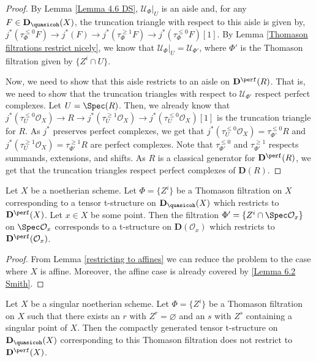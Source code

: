 \begin{proof}
    By Lemma \ref{Lemma 4.6 DS}, $\mathcal{U}_\Phi|_U$ is an aisle and, for any $F \in \mathbf{D}_{\quasicoh}(X)$, the truncation triangle with respect to this aisle is given by, $j^*(\tau_{\Phi}^{\leq 0}F) \to j^*(F) \to j^*(\tau_{\Phi}^{\geq 1}F) \to j^*(\tau_{\Phi}^{\leq 0}F)[1]$. By Lemma \ref{Thomason filtrations restrict nicely}, we know that $\mathcal{U}_\Phi|_U = \mathcal{U}_{\Phi'}$, where $\Phi'$ is the Thomason filtration given by $\{Z^i \cap U\}$. 

    Now, we need to show that this aisle restricts to an aisle on $\mathbf{D}^{\perf}(R)$. That is, we need to show that the truncation triangles with respect to $\mathcal{U}_{\Phi'}$ respect perfect complexes. Let $U = \Spec(R)$. Then, we already know that $j^*(\tau_{U}^{\leq 0}\mathcal{O}_X) \to R \to j^*(\tau_{U}^{\geq 1}\mathcal{O}_X) \to j^*(\tau_{U}^{\leq 0}\mathcal{O}_X)[1]$ is the truncation triangle for $R$. As $j^*$ preserves perfect complexes, we get that $j^*(\tau_{U}^{\leq 0}\mathcal{O}_X) = \tau_{\Phi'}^{\leq 0}R$ and $j^*(\tau_{U}^{\geq 1}\mathcal{O}_X) = \tau_{\Phi'}^{\geq 1}R$ are perfect complexes. Note that $\tau_{\Phi'}^{\leq 0}$ and $\tau_{\Phi'}^{\geq 1}$ respects summands, extensions, and shifts. As $R$ is a classical generator for $\mathbf{D}^{\perf}(R)$, we get that the truncation triangles respect perfect complexes of $\mathbf{D}(R)$.
\end{proof}


\begin{Lemma}\label{restricting to local rings}
    Let $X$ be a noetherian scheme. Let $\Phi=\{Z^i\}$ be a Thomason filtration on $X$ corresponding to a tensor t-structure on $\mathbf{D}_{\quasicoh}(X)$ which restricts to $\mathbf{D}^{\perf}(X)$. Let $x\in X$ be some point. Then the filtration $\Phi'=\{Z^i \cap \Spec \mathcal{O}_{x}\}$  on $\Spec \mathcal{O}_{x}$ corresponds to a t-structure on $\mathbf{D}(\mathcal{O}_{x})$ which restricts to $\mathbf{D}^{\perf}(\mathcal{O}_{x})$.
\end{Lemma}

\begin{proof}
     From Lemma \ref{restricting to affines} we can reduce the problem to the case where $X$ is affine. Moreover, the affine case is already covered by \ref{Lemma 6.2 Smith}.
\end{proof}

\begin{Lemma}\label{singular point}
   Let $X$ be a singular noetherian scheme. Let $\Phi=\{Z^i\}$ be a Thomason filtration on $X$ such that there exists an $r$ with $Z^r=\varnothing$ and an $s$ with $Z^s$ containing a singular point of $X$. Then the compactly generated tensor t-structure on $\mathbf{D}_{\quasicoh}(X)$ corresponding to this Thomason filtration does not restrict to $\mathbf{D}^{\perf}(X)$.
\end{Lemma}

